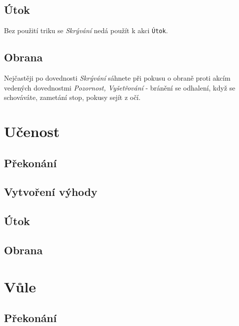\documentclass[../main.tex]{subfiles}
\begin{document}
\subsection*{Útok}
\label{subsec:skryvani-utok}
\utok

Bez použití triku se \textit{Skrývání} nedá použít k akci \texttt{Útok}.

\subsection*{Obrana}
\label{subsec:skryvani-obrana}


Nejčastěji po dovednosti \textit{Skrývání} sáhnete při pokusu o obraně proti akcím vedených dovednostmi \textit{Pozornost, Vyšetřování} - bránění se odhalení, když se schováváte, zametání stop, pokusy sejít z očí.

\section{Učenost}
\label{sec:ucenost}

\subsection*{Překonání}
\label{subsec:ucenost-prekonani}
\prekonani

\subsection*{Vytvoření výhody}
\label{subsec:ucenost-vytvoreni}
\vytvoreni

\subsection*{Útok}
\label{subsec:ucenost-utok}
\utok

\subsection*{Obrana}
\label{subsec:ucenost-obrana}
\obrana

\section{Vůle}
\label{sec:vule}

\subsection*{Překonání}
\label{subsec:vule-prekonani}
\prekonani
\end{document}
